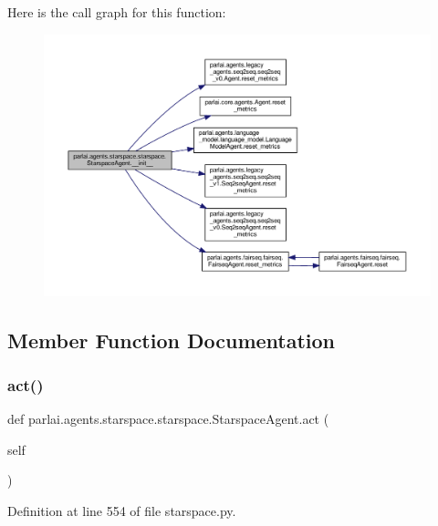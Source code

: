 Here is the call graph for this function\+:
\nopagebreak
\begin{figure}[H]
\begin{center}
\leavevmode
\includegraphics[width=350pt]{classparlai_1_1agents_1_1starspace_1_1starspace_1_1StarspaceAgent_a6bdc1142c021946ee6cb409d4f9dc3c9_cgraph}
\end{center}
\end{figure}


\subsection{Member Function Documentation}
\mbox{\label{classparlai_1_1agents_1_1starspace_1_1starspace_1_1StarspaceAgent_aff87fb1b28e798a9ca28a0dc3fbb2f22}} 
\subsubsection{\texorpdfstring{act()}{act()}}
{\footnotesize\ttfamily def parlai.\+agents.\+starspace.\+starspace.\+Starspace\+Agent.\+act (\begin{DoxyParamCaption}\item[{}]{self }\end{DoxyParamCaption})}



Definition at line 554 of file starspace.\+py.



